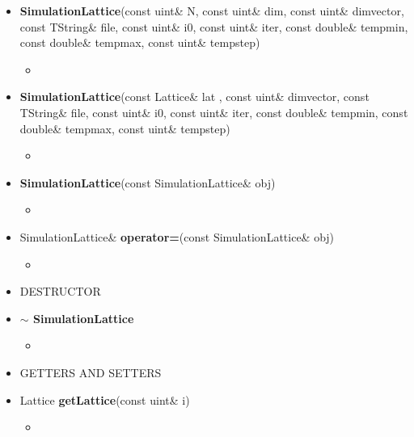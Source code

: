 \documentclass[11pt,a4paper]{article}
\begin{document}
\begin{itemize}
\begin{itemize}
			\item[] \textbf{SimulationLattice}(const uint\& \textunderscore N, const uint\& \textunderscore dim, const uint\& \textunderscore dim\textunderscore vector, const TString\& \textunderscore file, const uint\& \textunderscore i0, const uint\& \textunderscore iter, const double\& \textunderscore tempmin, const double\& \textunderscore tempmax, const uint\& \textunderscore tempstep)		 
			\begin{itemize}
				\item[] 
			\end{itemize}

			\item[] \textbf{SimulationLattice}(const Lattice\& \textunderscore lat , const uint\& \textunderscore dim\textunderscore vector, const TString\& \textunderscore file, const uint\& \textunderscore i0, const uint\& \textunderscore iter, const double\& \textunderscore tempmin, const double\& \textunderscore tempmax, const uint\& \textunderscore tempstep)			 
			\begin{itemize}
				\item[] 
			\end{itemize}
			
			\item[] \textbf{SimulationLattice}(const SimulationLattice\& obj)		 
			\begin{itemize}
				\item[] 
			\end{itemize}
			
			\item[] SimulationLattice\& \textbf{operator=}(const SimulationLattice\& obj)		 
			\begin{itemize}
				\item[] 
			\end{itemize}
		
		\item[] DESTRUCTOR \\
		
			\item[] \textbf{$\sim$ SimulationLattice}	 
			\begin{itemize}
				\item[] 
			\end{itemize}		
		
		\item[] GETTERS AND SETTERS \\
 			
 			\item[] Lattice \textbf{getLattice}(const uint\& i)		 
			\begin{itemize}
				\item[] 
			\end{itemize}
			

\end{itemize}
\end{itemize}
\end{document}
